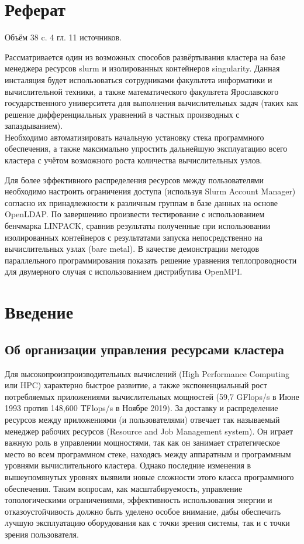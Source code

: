 \documentclass[a4paper]{extarticle}
\begin{document}
\fontsize{14}{12}\selectfont

\section*{Реферат}

Объём 38 c. 4 гл. 11 источников.

Рассматривается один из возможных способов развёртывания кластера на базе менеджера ресурсов slurm и изолированных контейнеров singularity. Данная инсталяция будет использоваться сотрудниками факультета информатики и вычислительной техники, а также математического факультета Ярославского государственного университета для выполнения вычислительных задач (таких как решение  дифференциальных уравнений в частных производных с запаздыванием).  \\ Необходимо автоматизировать начальную установку стека программного обеспечения, а также максимально упростить дальнейшую эксплуатацию всего кластера с учётом возможного роста количества
вычислительных узлов. 

Для более эффективного распределения ресурсов между пользователями необходимо настроить ограничения доступа (используя Slurm Account Manager) согласно их принадлежности к различным группам в базе данных на основе OpenLDAP. По завершению произвести тестирование с использованием бенчмарка LINPACK, сравнив результаты полученные при использовании изолированных контейнеров с результатами запуска непосредственно на вычислительных узлах (bare metal). В качестве демонстрации методов параллельного программирования показать решение уравнения теплопроводности для двумерного случая с использованием дистрибутива OpenMPI.

\clearpage

\section*{Введение}

\subsection*{Об организации управления ресурсами кластера}

Для высокопроизпроизводительных вычислений (High Performance Computing или HPC) характерно быстрое развитие, а также экспоненциальный рост потребляемых приложениями вычислительных мощностей (59,7 GFlops/s в Июне 1993 против 148,600 TFlops/s в Ноябре 2019\cite{top500}). За доставку и распределение ресурсов между приложениями (и пользователями) отвечает так называемый менеджер рабочих ресурсов (Resource and Job Management system).  Он играет важную роль в управлении мощностями, так как он занимает стратегическое место во всем программном стеке, находясь между аппаратным
и программным уровнями вычислительного кластера. Однако последние изменения в вышеупомянутых уровнях выявили новые сложности этого класса программного обеспечения. Таким вопросам, как масштабируемость, управление топологическими ограничениями, эффективность использования энергии и отказоустойчивость должно быть уделено особое внимание, дабы обеспечить лучшую эксплуатацию оборудования как с точки зрения системы, так и с точки зрения пользователя.
\end{document}
